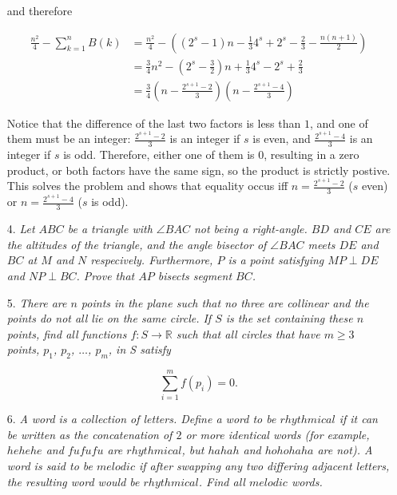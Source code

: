 \documentclass{article}
\begin{document}
\begin{enumerate}
and therefore

\begin{align*}
	\frac{n^2}{4} - \sum_{k = 1}^{n} B(k) &= \frac{n^2}{4} - ((2^s - 1)n - \frac{1}{3}4^s + 2^s - \frac{2}{3} - \frac{n(n + 1)}{2}) \\
	&= \frac{3}{4}n^2 - (2^s - \frac{3}{2})n + \frac{1}{3}4^s - 2^s + \frac{2}{3} \\
	&= \frac{3}{4}(n - \frac{2^{s + 1} - 2}{3})(n - \frac{2^{s + 1} - 4}{3})
\end{align*}

Notice that the difference of the last two factors is less than $1$, and one of them must be an integer: $\frac{2^{s + 1} - 2}{3}$ is an integer if $s$ is even, and $\frac{2^{s + 1} - 4}{3}$ is an integer if $s$ is odd. Therefore, either one of them is $0$, resulting in a zero product, or both factors have the same sign, so the product is strictly postive. This solves the problem and shows that equality occus iff $n = \frac{2^{s + 1} - 2}{3}$ ($s$ even) or $n = \frac{2^{s + 1} - 4}{3}$ ($s$ is odd).

\medskip
\item[4.] %
\textit{Let $ABC$ be a triangle with $\angle BAC$ not being a right-angle. $BD$ and $CE$ are the altitudes of the triangle, and the angle bisector of $\angle BAC$ meets $DE$ and $BC$ at $M$ and $N$ respecively. Furthermore, $P$ is a point satisfying $MP \perp DE$ and $NP \perp BC$. Prove that $AP$ bisects segment $BC$.}




\medskip
\item[5.] %
\textit{There are $n$ points in the plane such that no three are collinear and the points do not all lie on the same circle. If $S$ is the set containing these $n$ points, find all functions $f : S \rightarrow \mathbb{R}$ such that all circles that have $m \ge 3$ points, $p_1$, $p_2$, $\dots$, $p_m$, in S satisfy}

$$\sum_{i = 1}^{m} f(p_i) = 0.$$



\medskip
\item[6.] %
\textit{A word is a collection of letters. Define a word to be $rhythmical$ if it can be written as the concatenation of $2$ or more identical words (for example, $hehehe$ and $fufufu$ are $rhythmical$, but $hahah$ and $hohohaha$ are not). A word is said to be $melodic$ if after swapping any two differing adjacent letters, the resulting word would be $rhythmical$. Find all $melodic$ words.}


\end{enumerate}
\end{document}
